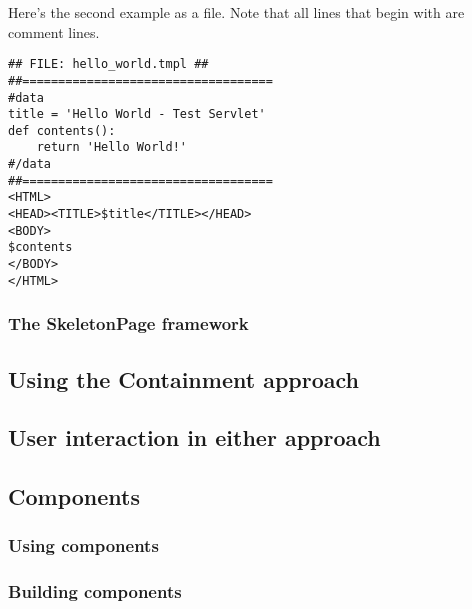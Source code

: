 Here's the second example as a  file.  Note that all lines that begin with
\code{\#\#} are comment lines.

\begin{verbatim}
## FILE: hello_world.tmpl ##
##===================================
#data
title = 'Hello World - Test Servlet'
def contents():
    return 'Hello World!'
#/data
##===================================
<HTML>
<HEAD><TITLE>$title</TITLE></HEAD>
<BODY>
$contents
</BODY>
</HTML>
\end{verbatim}


\subsubsection{The SkeletonPage framework}
\label{webware.inheritance.skeletonPage}


\subsection{Using the Containment approach}
\label{webware.containment}


\subsection{User interaction in either approach}
\label{webware.userInteraction}

\subsection{Components}
\label{webware.components}


\subsubsection{Using components}
\label{webware.components.using}

\subsubsection{Building components}
\label{webware.components.building}

